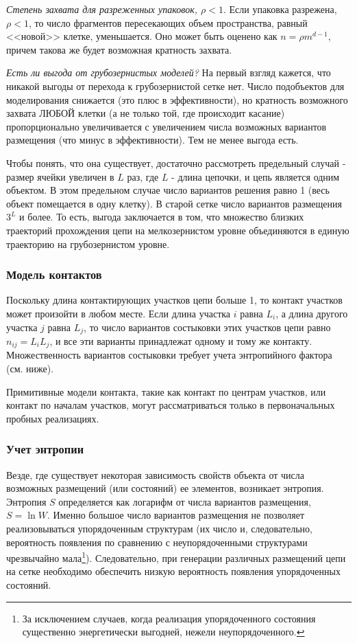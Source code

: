 \documentclass[tikz,a4paper]{scrartcl} %
\begin{document}
\textit{Степень захвата для разреженных упаковок, $\rho < 1$}. Если упаковка разрежена, $\rho < 1$, то число фрагментов пересекающих объем пространства, равный <<новой>> клетке, уменьшается. Оно может быть оценено как $n = \rho m^{d-1}$, причем такова же будет возможная кратность захвата.

\textit{Есть ли выгода от грубозернистых моделей?} На первый взгляд кажется, что никакой выгоды от перехода к грубозернистой сетке нет. Число подобъектов для моделирования снижается (это плюс в эффективности), но кратность возможного захвата ЛЮБОЙ клетки (а не только той, где происходит касание) пропорционально увеличивается с увеличением числа возможных вариантов размещения (что минус в эффективности). Тем не менее выгода есть. 

Чтобы понять, что она существует, достаточно рассмотреть предельный случай - размер ячейки увеличен в $L$ раз, где $L$ - длина цепочки, и цепь является одним объектом. В этом предельном случае число вариантов решения равно 1 (весь объект помещается в одну клетку). В старой сетке число вариантов размещения $3^L$ и более. То есть, выгода заключается в том, что множество близких траекторий прохождения цепи на мелкозернистом уровне объединяются в единую траекторию на грубозернистом уровне.

\subsubsection*{Модель контактов}
Поскольку длина контактирующих участков цепи больше 1, то контакт участков может произойти в любом месте. Если длина участка $i$ равна $L_i$, а длина другого участка $j$ равна $L_j$, то число вариантов состыковки этих участков цепи равно $n_{ij} = L_i L_j$, и все эти варианты принадлежат одному и тому же контакту. Множественность вариантов состыковки требует учета энтропийного фактора (см. ниже).

Примитивные модели контакта, такие как контакт по центрам участков, или контакт по началам участков, могут рассматриваться только в первоначальных пробных реализациях. 

\subsubsection*{Учет энтропии}
Везде, где существует некоторая зависимость свойств объекта от числа возможных размещений (или состояний) ее элементов, возникает энтропия. Энтропия $S$ определяется как логарифм от числа вариантов размещения, $S = \ln W$. Именно большое число вариантов размещения не позволяет реализовываться упорядоченным структурам (их число и, следовательно, вероятность появления по сравнению с неупорядоченными структурами чрезвычайно мала\footnote{За исключением случаев, когда реализация упорядоченного состояния существенно энергетически выгодней, нежели неупорядоченного.}). Следовательно, при генерации различных размещений цепи на сетке необходимо обеспечить низкую вероятность появления упорядоченных состояний.
\end{document}
